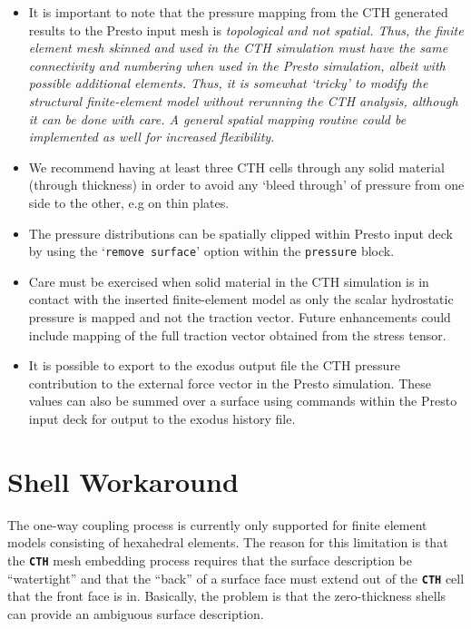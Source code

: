 \documentclass[11pt,twoside]{article}
\newcommand{\cmd}[1]
   {\mbox{\tt #1}\null}
\newcommand{\code}[1]
   {\mbox{\bf\tt #1}\null}
\begin{document}
\begin{itemize}
\item It is important to note that the pressure mapping from the CTH generated
results to the Presto input mesh is \em{topological} and not \em{spatial}.
 Thus, the finite element mesh skinned and used in the CTH simulation
must have the same connectivity and numbering when used in the Presto
simulation, albeit with possible additional elements.  Thus, it is
somewhat `tricky' to modify the structural finite{}-element model
without rerunning the CTH analysis, although it can be done with care.
 A general spatial mapping routine could be implemented as well for
increased flexibility.

\item We recommend having at least three CTH cells through any solid material
(through thickness) in order to avoid any `bleed through' of pressure
from one side to the other, e.g on thin plates.  

\item The pressure distributions can be spatially clipped within Presto input
deck by using the `\cmd{remove surface}' option within the
\cmd{pressure} block. 

\item Care must be exercised when solid material in the CTH simulation is in
contact with the inserted finite{}-element model as only the scalar
hydrostatic pressure is mapped and not the traction vector.  Future
enhancements could include mapping of the full traction vector obtained
from the stress tensor.

\item It is possible to export to the exodus output file the CTH pressure
contribution to the external force vector in the Presto simulation.
 These values can also be summed over a surface using commands within
the Presto input deck for output to the exodus history file.

\end{itemize}

\section{Shell Workaround}\label{sec:shell}

The one-way coupling process is currently only supported for finite
element models consisting of hexahedral elements.  The reason for this
limitation is that the \code{CTH} mesh embedding process requires that the
surface description be ``watertight'' and that the ``back'' of a
surface face must extend out of the \code{CTH} cell that the front
face is in.  Basically, the problem is that the zero-thickness shells
can provide an ambiguous surface description.
\end{document}
